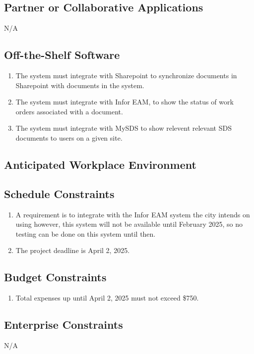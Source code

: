 \documentclass[12pt]{article}
\begin{document}
\subsection{Partner or Collaborative Applications}
N/A
\subsection{Off-the-Shelf Software}
\begin{enumerate} [{C-OTS}1.]
  \item The system must integrate with Sharepoint to synchronize documents in
  Sharepoint with documents in the system.
  \item The system must integrate with Infor EAM, to show the status of work
  orders associated with a document.
  \item The system must integrate with MySDS to show relevent relevant SDS
  documents to users on a given site.
\end{enumerate}

\subsection{Anticipated Workplace Environment}

\subsection{Schedule Constraints}
\begin{enumerate} [{C-SCH}1.]
  \item A requirement is to integrate with the Infor EAM system the city intends
  on using however, this system will not be available until February 2025, so no
  testing can be done on this system until then.

  \item The project deadline is April 2, 2025.
\end{enumerate}

\subsection{Budget Constraints}
\begin{enumerate} [{C-BDG}1.]
  \item Total expenses up until April 2, 2025 must not exceed \$750.
\end{enumerate}

\subsection{Enterprise Constraints}
N/A
\end{document}
